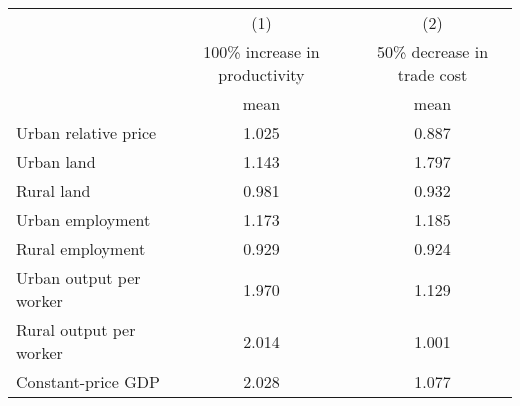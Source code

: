 {
\def\sym#1{\ifmmode^{#1}\else\(^{#1}\)\fi}
\begin{tabular}{l*{2}{c}}
\hline\hline
                    &\multicolumn{1}{c}{(1)}&\multicolumn{1}{c}{(2)}\\
                    &100\% increase in productivity&50\% decrease in trade cost\\
                    &        mean&        mean\\
\hline
Urban relative price&       1.025&       0.887\\
Urban land          &       1.143&       1.797\\
Rural land          &       0.981&       0.932\\
Urban employment    &       1.173&       1.185\\
Rural employment    &       0.929&       0.924\\
Urban output per worker&       1.970&       1.129\\
Rural output per worker&       2.014&       1.001\\
Constant-price GDP  &       2.028&       1.077\\
\hline\hline
\end{tabular}
}
